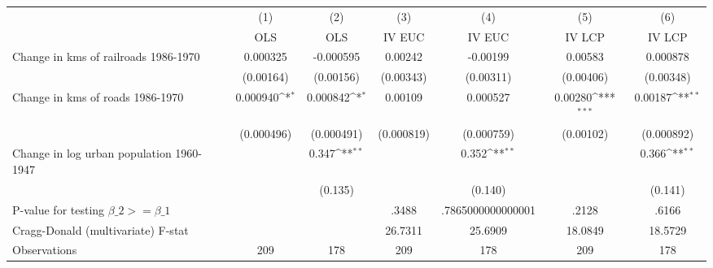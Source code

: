 {
\def\sym#1{\ifmmode^{#1}\else\(^{#1}\)\fi}
\begin{tabular}{l*{6}{c}}
\hline\hline
                &\multicolumn{1}{c}{(1)}&\multicolumn{1}{c}{(2)}&\multicolumn{1}{c}{(3)}&\multicolumn{1}{c}{(4)}&\multicolumn{1}{c}{(5)}&\multicolumn{1}{c}{(6)}\\
                &\multicolumn{1}{c}{OLS}&\multicolumn{1}{c}{OLS}&\multicolumn{1}{c}{IV EUC}&\multicolumn{1}{c}{IV EUC}&\multicolumn{1}{c}{IV LCP}&\multicolumn{1}{c}{IV LCP}\\
\hline
Change in kms of railroads 1986-1970& 0.000325         &-0.000595         &  0.00242         & -0.00199         &  0.00583         & 0.000878         \\
                &(0.00164)         &(0.00156)         &(0.00343)         &(0.00311)         &(0.00406)         &(0.00348)         \\
[1em]
Change in kms of roads 1986-1970& 0.000940\sym{*}  & 0.000842\sym{*}  &  0.00109         & 0.000527         &  0.00280\sym{***}&  0.00187\sym{**} \\
                &(0.000496)         &(0.000491)         &(0.000819)         &(0.000759)         &(0.00102)         &(0.000892)         \\
[1em]
Change in log urban population 1960-1947&                  &    0.347\sym{**} &                  &    0.352\sym{**} &                  &    0.366\sym{**} \\
                &                  &  (0.135)         &                  &  (0.140)         &                  &  (0.141)         \\
\hline
P-value for testing $\beta\_{2} >= \beta\_{1}$&                  &                  &    .3488         &.7865000000000001         &    .2128         &    .6166         \\
Cragg-Donald (multivariate) F-stat&                  &                  &  26.7311         &  25.6909         &  18.0849         &  18.5729         \\
Observations    &      209         &      178         &      209         &      178         &      209         &      178         \\
\hline\hline
\end{tabular}
}
